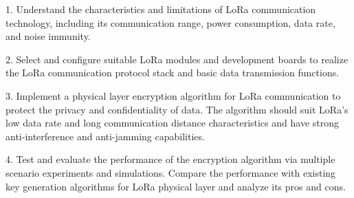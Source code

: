 1. Understand the characteristics and limitations of LoRa communication technology, including its communication range, power consumption, data rate, and noise immunity.

2. Select and configure suitable LoRa modules and development boards to realize the LoRa communication protocol stack and basic data transmission functions.

3. Implement a physical layer encryption algorithm for LoRa communication to protect the privacy and confidentiality of data. The algorithm should suit LoRa's low data rate and long communication distance characteristics and have strong anti-interference and anti-jamming capabilities.

4. Test and evaluate the performance of the encryption algorithm via multiple scenario experiments and simulations. Compare the performance with existing key generation algorithms for LoRa physical layer and analyze its pros and cons.

